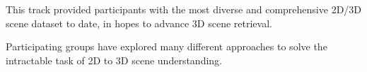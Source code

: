 \documentclass[../main.tex]{subfiles}
\begin{document}
This track provided participants with the most diverse and comprehensive 2D/3D scene dataset to date, in hopes to advance 3D scene retrieval.

Participating groups have explored many different approaches to solve the intractable task of 2D to 3D scene understanding. 
\end{document}
